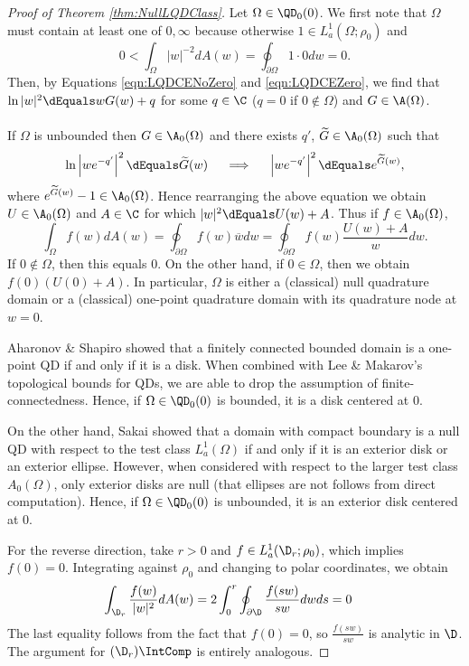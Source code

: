 \documentclass{article}
\numberwithin{equation}{section}
\begin{document}
\begin{proof}[Proof of Theorem \ref{thm:NullLQDClass}]\label{proof:NullLQDClass}
Let $\Omega\in\QD_0(0)$. We first note that $\Omega$ must contain at least one of $0,\infty$ because otherwise $1\in L_a^1(\Omega;\rho_0)$ and
$$0<\int_{\Omega}|w|^{-2}dA(w)=\oint_{\partial\Omega}1\cdot0dw=0.$$
Then, by Equations \ref{eqn:LQDCENoZero} and \ref{eqn:LQDCEZero}, we find that $\ln|w|^2\dEquals wG(w)+q$ for some $q\in\C$ ($q=0$ if $0\notin\Omega$) and $G\in\A(\Omega)$.\\\\
If $\Omega$ is unbounded then $G\in\A_0(\Omega)$ and there exists $q'$, $\widetilde{G}\in\A_0(\Omega)$ such that
$$\ln\left|we^{-q'}\right|^2\dEquals \widetilde{G}(w)\;\;\;\;\implies\;\;\;\;\left|we^{-q'}\right|^2\dEquals e^{\widetilde{G}(w)},$$
where $e^{\widetilde{G}(w)}-1\in\A_0(\Omega)$. Hence rearranging the above equation we obtain $U\in\A_0(\Omega)$ and $A\in\C$ for which $|w|^2\dEquals U(w)+A$. Thus if $f\in\A_0(\Omega)$,
$$\int_{\Omega}f(w)dA(w)=\oint_{\partial\Omega}f(w)\overline{w}dw=\oint_{\partial\Omega}f(w)\dfrac{U(w)+A}{w}dw.$$
If $0\notin\Omega$, then this equals $0$. On the other hand, if $0\in\Omega$, then we obtain $f(0)\left(U(0)+A\right)$. In particular, $\Omega$ is either a (classical) null quadrature domain or a (classical) one-point quadrature domain with its quadrature node at $w=0$. 

Aharonov \& Shapiro \cite{AharonovShapiro} showed that a finitely connected bounded domain is a one-point QD if and only if it is a disk. When combined with Lee \& Makarov's \cite{Lee_2015} topological bounds for QDs, we are able to drop the assumption of finite-connectedness. Hence, if $\Omega\in\QD_0(0)$ is bounded, it is a disk centered at $0$.

On the other hand, Sakai \cite{SakaiNullQD} showed that a domain with compact boundary is a null QD with respect to the test class $L_a^1(\Omega)$ if and only if it is an exterior disk or an exterior ellipse. However, when considered with respect to the larger test class $A_0(\Omega)$, only exterior disks are null (that ellipses are not follows from direct computation). Hence, if $\Omega\in\QD_0(0)$ is unbounded, it is an exterior disk centered at $0$.

For the reverse direction, take $r>0$ and $f\in L_a^1(\D_r;\rho_0)$, which implies $f(0)=0$. Integrating against $\rho_0$ and changing to polar coordinates, we obtain
\begin{align*}
    \int_{\D_r}\dfrac{f(w)}{|w|^2}dA(w)&=2\int_{0}^r\oint_{\partial\D}\dfrac{f(sw)}{sw}dw ds=0
\end{align*}
The last equality follows from the fact that $f(0)=0$, so $\frac{f(sw)}{sw}$ is analytic in $\D$. The argument for $(\D_r)\IntComp$ is entirely analogous.
\end{proof}
\end{document}
